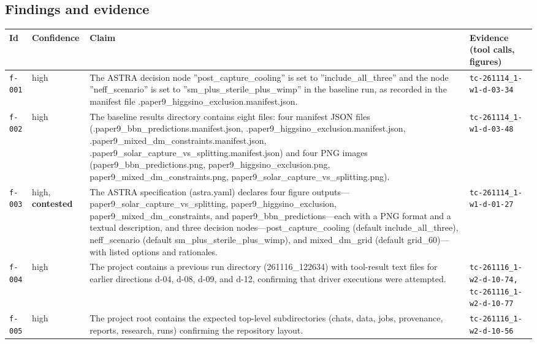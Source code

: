 \documentclass[11pt,a4paper]{article}
\begin{document}
\subsection{Findings and evidence}
\begin{longtable}{@{}p{}p{}p{}p{}@{}}
\toprule Id & Confidence & Claim & Evidence (tool calls, figures) \\ \midrule \endhead
\texttt{f-001} & high & The ASTRA decision node ''post\_capture\_cooling'' is set to ''include\_all\_three'' and the node ''neff\_scenario'' is set to ''sm\_plus\_sterile\_plus\_wimp'' in the baseline run, as recorded in the manifest file .paper9\_higgsino\_exclusion.manifest.json. & \texttt{tc-261114\_\allowbreak{}1-w1-d-03-34} \\
\texttt{f-002} & high & The baseline results directory contains eight files: four manifest JSON files (.paper9\_bbn\_predictions.manifest.json, .paper9\_higgsino\_exclusion.manifest.json, .paper9\_mixed\_dm\_constraints.manifest.json, .paper9\_solar\_capture\_vs\_splitting.manifest.json) and four PNG images (paper9\_bbn\_predictions.png, paper9\_higgsino\_exclusion.png, paper9\_mixed\_dm\_constraints.png, paper9\_solar\_capture\_vs\_splitting.png). & \texttt{tc-261114\_\allowbreak{}1-w1-d-03-48} \\
\texttt{f-003} & high, \textbf{contested} & The ASTRA specification (astra.yaml) declares four figure outputs---paper9\_solar\_capture\_vs\_splitting, paper9\_higgsino\_exclusion, paper9\_mixed\_dm\_constraints, and paper9\_bbn\_predictions---each with a PNG format and a textual description, and three decision nodes---post\_capture\_cooling (default include\_all\_three), neff\_scenario (default sm\_plus\_sterile\_plus\_wimp), and mixed\_dm\_grid (default grid\_60)---with listed options and rationales. & \texttt{tc-261114\_\allowbreak{}1-w1-d-01-27} \\
\texttt{f-004} & high & The project contains a previous run directory (261116\_122634) with tool-result text files for earlier directions d-04, d-08, d-09, and d-12, confirming that driver executions were attempted. & \texttt{tc-261116\_\allowbreak{}1-w2-d-10-74,\allowbreak{} tc-261116\_\allowbreak{}1-w2-d-10-77} \\
\texttt{f-005} & high & The project root contains the expected top-level subdirectories (chats, data, jobs, provenance, reports, research, runs) confirming the repository layout. & \texttt{tc-261116\_\allowbreak{}1-w2-d-10-56} \\

\end{longtable}
\end{document}
